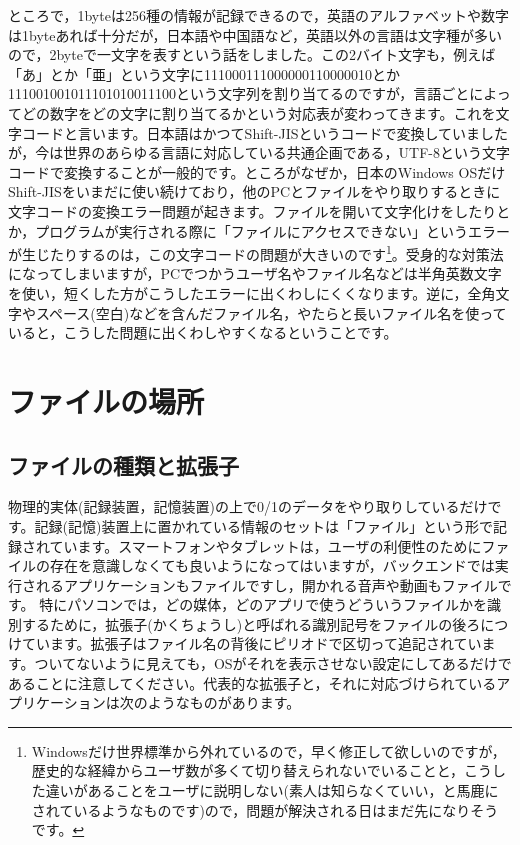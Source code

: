 \documentclass{ltjsbook}
\begin{document}
ところで，1byteは256種の情報が記録できるので，英語のアルファベットや数字は1byteあれば十分だが，日本語や中国語など，英語以外の言語は文字種が多いので，2byteで一文字を表すという話をしました。この2バイト文字も，例えば「あ」とか「亜」という文字に111000111000000110000010とか111001001011101010011100という文字列を割り当てるのですが，言語ごとによってどの数字をどの文字に割り当てるかという対応表が変わってきます。これを文字コードと言います。日本語はかつてShift-JISというコードで変換していましたが，今は世界のあらゆる言語に対応している共通企画である，UTF-8という文字コードで変換することが一般的です。ところがなぜか，日本のWindows OSだけShift-JISをいまだに使い続けており，他のPCとファイルをやり取りするときに文字コードの変換エラー問題が起きます。ファイルを開いて文字化けをしたりとか，プログラムが実行される際に「ファイルにアクセスできない」というエラーが生じたりするのは，この文字コードの問題が大きいのです\footnote{Windowsだけ世界標準から外れているので，早く修正して欲しいのですが，歴史的な経緯からユーザ数が多くて切り替えられないでいることと，こうした違いがあることをユーザに説明しない(素人は知らなくていい，と馬鹿にされているようなものです)ので，問題が解決される日はまだ先になりそうです。}。受身的な対策法になってしまいますが，PCでつかうユーザ名やファイル名などは半角英数文字を使い，短くした方がこうしたエラーに出くわしにくくなります。逆に，全角文字やスペース(空白)などを含んだファイル名，やたらと長いファイル名を使っていると，こうした問題に出くわしやすくなるということです。


\section{ファイルの場所}
\subsection{ファイルの種類と拡張子}
\label{suffix}
物理的実体(記録装置，記憶装置)の上で0/1のデータをやり取りしているだけです。記録(記憶)装置上に置かれている情報のセットは「ファイル」という形で記録されています。スマートフォンやタブレットは，ユーザの利便性のためにファイルの存在を意識しなくても良いようになってはいますが，バックエンドでは実行されるアプリケーションもファイルですし，開かれる音声や動画もファイルです。
特にパソコンでは，どの媒体，どのアプリで使うどういうファイルかを識別するために，拡張子(かくちょうし)と呼ばれる識別記号をファイルの後ろにつけています。拡張子はファイル名の背後にピリオドで区切って追記されています。ついてないように見えても，OSがそれを表示させない設定にしてあるだけであることに注意してください。代表的な拡張子と，それに対応づけられているアプリケーションは次のようなものがあります。
\end{document}

